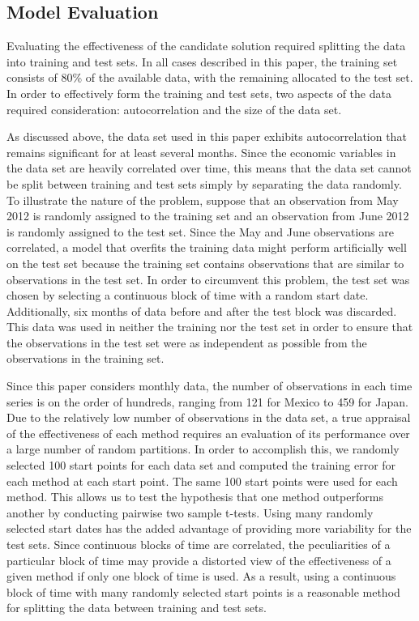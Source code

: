 \documentclass{sig-alternate-05-2015}
\begin{document}
\subsection{Model Evaluation}
Evaluating the effectiveness of the candidate solution required splitting the data into training and test sets. In all cases described in this paper, the training set consists of 80\% of the available data, with the remaining allocated to the test set. In order to effectively form the training and test sets, two aspects of the data required consideration: autocorrelation and the size of the data set.
\par{} As discussed above, the data set used in this paper exhibits autocorrelation that remains significant for at least several months. Since the economic variables in the data set are heavily correlated over time, this means that the data set cannot be split between training and test sets simply by separating the data randomly. To illustrate the nature of the problem, suppose that an observation from May 2012 is randomly assigned to the training set and an observation from June 2012 is randomly assigned to the test set. Since the May and June observations are correlated, a model that overfits the training data might perform artificially well on the test set because the training set contains observations that are similar to observations in the test set. In order to circumvent this problem, the test set was chosen by selecting a continuous block of time with a random start date. Additionally, six months of data before and after the test block was discarded. This data was used in neither the training nor the test set in order to ensure that the observations in the test set were as independent as possible from the observations in the training set.
\par{} Since this paper considers monthly data, the number of observations in each time series is on the order of hundreds, ranging from 121 for Mexico to 459 for Japan. Due to the relatively low number of observations in the data set, a true appraisal of the effectiveness of each method requires an evaluation of its performance over a large number of random partitions. In order to accomplish this, we randomly selected 100 start points for each data set and computed the training error for each method at each start point. The same 100 start points were used for each method. This allows us to test the hypothesis that one method outperforms another by conducting pairwise two sample t-tests. Using many randomly selected start dates has the added advantage of providing more variability for the test sets. Since continuous blocks of time are correlated, the peculiarities of a particular block of time may provide a distorted view of the effectiveness of a given method if only one block of time is used. As a result, using a continuous block of time with many randomly selected start points is a reasonable method for splitting the data between training and test sets.
\end{document}
